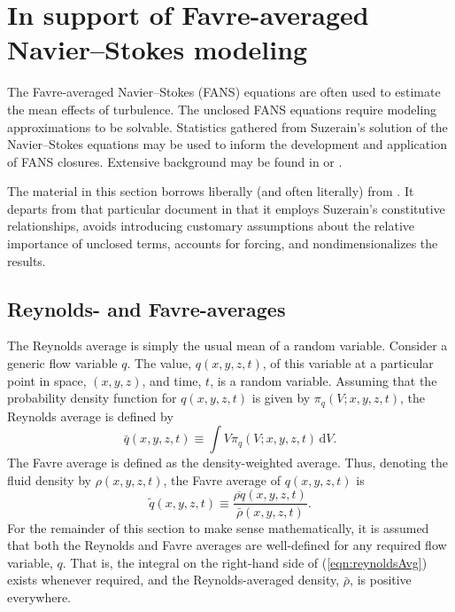 
\section{In support of Favre-averaged Navier--Stokes modeling}
\label{sec:supportFANS}


The Favre-averaged Navier--Stokes (FANS) equations are often used to estimate
the mean effects of turbulence.  The unclosed FANS equations require modeling
approximations to be solvable.  Statistics gathered from Suzerain's solution of
the Navier--Stokes equations may be used to inform the development and
application of FANS closures.  Extensive background may be found in
\citet{Chassaing2010} or \citet{SmitsDussauge2005}.

The material in this section borrows liberally (and often literally) from
\citet{OliverFANSModels2011}.  It departs from that particular document in that
it employs Suzerain's constitutive relationships, avoids introducing customary
assumptions about the relative importance of unclosed terms, accounts for
forcing, and nondimensionalizes the results.

\subsection{Reynolds- and Favre-averages}
\label{sec:averaging}

The Reynolds average is simply the usual mean of a random variable.  Consider a
generic flow variable $q$.  The value, $q(x, y, z, t)$, of this variable at a
particular point in space, $(x, y, z)$, and time, $t$, is a random variable.
Assuming that the probability density function for $q(x, y, z, t)$ is given by
$\pi_q(V; x, y, z, t)$, the Reynolds average is defined by
%
\begin{equation}
\label{eqn:reynoldsAvg}
\bar{q}(x, y, z, t) \equiv \int V \pi_q(V; x, y, z, t) \,\mathrm{d} V.
\end{equation}
%
The Favre average is defined as the density-weighted average.  Thus,
denoting the fluid density by $\rho(x,y,z, t)$, the Favre average of
$q(x,y,z, t)$ is
%
\begin{equation*}
\tilde{q}(x,y,z, t) \equiv \frac{ \overline{\rho q}(x,y,z, t) }{ \bar{\rho}(x,y,z, t) }.
\end{equation*}
%
For the remainder of this section to make sense mathematically, it is
assumed that both the Reynolds and Favre averages are well-defined for
any required flow variable, $q$.  That is, the integral on the
right-hand side of (\ref{eqn:reynoldsAvg}) exists whenever required,
and the Reynolds-averaged density, $\bar{\rho}$, is positive
everywhere.

